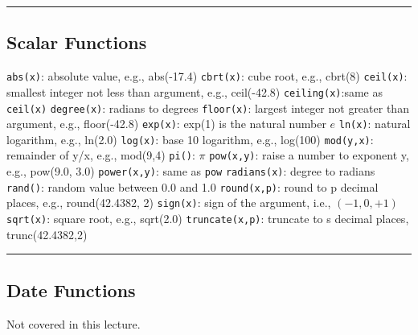 \documentclass{article}
\begin{document}
\hspace{-0.5cm}\rule[-0.101in]{\textwidth}{0.0025in}
    
  
  
   
 
 
 
  
 \subsection*{Scalar Functions}
 
\begin{outline}
   \1 \texttt{abs(x)}: absolute value, e.g., abs(-17.4)
   \1 \texttt{cbrt(x)}: cube root, e.g., cbrt(8)
   \1 \texttt{ceil(x)}: smallest integer not less than argument, e.g., ceil(-42.8)
   \1 \texttt{ceiling(x)}:same as \texttt{ceil(x)}
   \1 \texttt{degree(x)}: radians to degrees
   \1 \texttt{floor(x)}: largest integer not greater than argument, e.g.,  floor(-42.8)
   \1 \texttt{exp(x)}: exp(1) is the natural number $e$
   \1 \texttt{ln(x)}: natural logarithm, e.g., ln(2.0)
   \1 \texttt{log(x)}: base 10 logarithm,  e.g., log(100)
   \1 \texttt{mod(y,x)}: remainder of y/x, e.g., mod(9,4)
   \1 \texttt{pi()}: $\pi$
   \1 \texttt{pow(x,y)}: raise a number to exponent y, e.g., pow(9.0, 3.0)
   \1 \texttt{power(x,y)}: same as \texttt{pow}
   \1 \texttt{radians(x)}: degree to radians
   \1 \texttt{rand()}: random value between 0.0 and 1.0
   \1 \texttt{round(x,p)}: round to p decimal places, e.g., round(42.4382, 2)
   \1 \texttt{sign(x)}: sign of the argument, i.e., $(-1, 0, +1)$
   \1 \texttt{sqrt(x)}: square root, e.g., sqrt(2.0)
   \1 \texttt{truncate(x,p)}: truncate to s decimal places, trunc(42.4382,2)
\end{outline}
 
  
  
   

\hspace{-0.5cm}\rule[-0.101in]{\textwidth}{0.0025in}
    
  
 
 
  
 \subsection*{Date Functions}
 
 Not covered in this lecture.     
 
\end{document}
